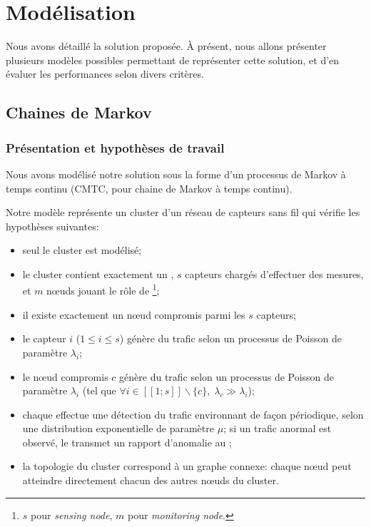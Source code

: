 \section{Modélisation}
\label{sa:sec:modelisation}

Nous avons détaillé la solution proposée. À présent, nous allons présenter plusieurs modèles possibles permettant de représenter cette solution, et d'en évaluer les performances selon divers critères.

    \subsection{Chaines de Markov}

        \subsubsection{Présentation et hypothèses de travail}
Nous avons modélisé notre solution sous la forme d'un processus de Markov à temps continu (CMTC, pour chaine de Markov à temps continu).

Notre modèle représente un cluster d'un réseau de capteurs sans fil qui vérifie les hypothèses suivantes:
\begin{itemize}
    \item seul le cluster est modélisé;
    \item le cluster contient exactement un \CH, $s$ capteurs chargés d'effectuer des mesures, et $m$ nœuds jouant le rôle de \cns\footnote{$s$ pour \textit{sensing node}, $m$ pour \textit{monitoring node}.};
    \item il existe exactement un nœud compromis parmi les $s$ capteurs;
    \item le capteur $i$ ($1 \leq i \leq s$) génère du trafic selon un processus de Poisson de paramètre $\lambda_i$;
    \item le nœud compromis $c$ génère du trafic selon un processus de Poisson de paramètre $\lambda_i$ (tel que $\forall i\in[\![1;s]\!]\backslash\{c\},\; \lambda_c\gg\lambda_i$);
    \item chaque \cn effectue une détection du trafic environnant de façon périodique, selon une distribution exponentielle de paramètre $\mu$; si un trafic anormal est observé, le \cn transmet un rapport d'anomalie au \CH;
    \item la topologie du cluster correspond à un graphe connexe: chaque nœud peut atteindre directement chacun des autres nœuds du cluster.
\end{itemize}

